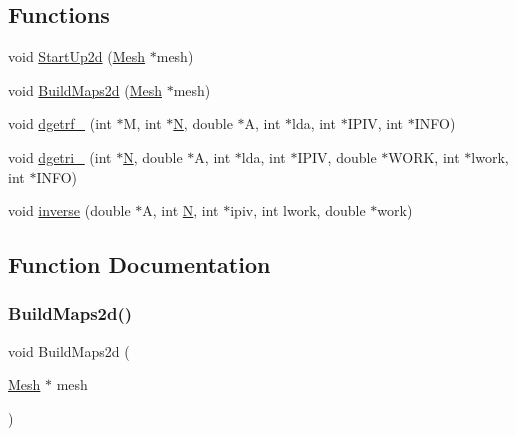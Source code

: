 \subsection*{Functions}
\begin{DoxyCompactItemize}
\item 
void \hyperlink{a00596_a35ba318a20f8b83eefe63eeb1e1ac4b0}{Start\+Up2d} (\hyperlink{a00557_aeffbe0891ab73a4d8964c9cb7978426e}{Mesh} $\ast$mesh)
\item 
void \hyperlink{a00596_ac0114aa8a9d094bad20943e1b79ba473}{Build\+Maps2d} (\hyperlink{a00557_aeffbe0891ab73a4d8964c9cb7978426e}{Mesh} $\ast$mesh)
\item 
void \hyperlink{a00596_a9ade98d71580bb70e0ddf663d30e4bb4}{dgetrf\+\_\+} (int $\ast$M, int $\ast$\hyperlink{a00473_a5b9c4563028063ee53b517cce9aa701b}{N}, double $\ast$A, int $\ast$lda, int $\ast$I\+P\+IV, int $\ast$I\+N\+FO)
\item 
void \hyperlink{a00596_af83709f5dcd4b9fbff71c3623b64fa21}{dgetri\+\_\+} (int $\ast$\hyperlink{a00473_a5b9c4563028063ee53b517cce9aa701b}{N}, double $\ast$A, int $\ast$lda, int $\ast$I\+P\+IV, double $\ast$W\+O\+RK, int $\ast$lwork, int $\ast$I\+N\+FO)
\item 
void \hyperlink{a00596_ad2387c52fae7bf66e1511ef9a281ee26}{inverse} (double $\ast$A, int \hyperlink{a00473_a5b9c4563028063ee53b517cce9aa701b}{N}, int $\ast$ipiv, int lwork, double $\ast$work)
\end{DoxyCompactItemize}


\subsection{Function Documentation}
\mbox{\label{a00596_ac0114aa8a9d094bad20943e1b79ba473}} 
\subsubsection{\texorpdfstring{Build\+Maps2d()}{BuildMaps2d()}}
{\footnotesize\ttfamily void Build\+Maps2d (\begin{DoxyParamCaption}\item[{\hyperlink{a00557_aeffbe0891ab73a4d8964c9cb7978426e}{Mesh} $\ast$}]{mesh }\end{DoxyParamCaption})}

